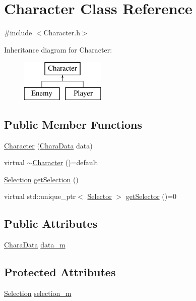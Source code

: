 \hypertarget{class_character}{}\section{Character Class Reference}
\label{class_character}


{\ttfamily \#include $<$Character.\+h$>$}

Inheritance diagram for Character\+:\begin{figure}[H]
\begin{center}
\leavevmode
\includegraphics[height=2.000000cm]{class_character}
\end{center}
\end{figure}
\subsection*{Public Member Functions}
\begin{DoxyCompactItemize}
\item 
\hyperlink{class_character_a51971ccee9f890b6cd2f354ca6363564}{Character} (\hyperlink{struct_chara_data}{Chara\+Data} data)
\item 
virtual \hyperlink{class_character_a3333a88ae593c36b229c90371e935d42}{$\sim$\+Character} ()=default
\item 
\hyperlink{struct_selection}{Selection} \hyperlink{class_character_a854b7c44f252ed1c8456112ca2bee9a1}{get\+Selection} ()
\item 
virtual std\+::unique\+\_\+ptr$<$ \hyperlink{class_selector}{Selector} $>$ \hyperlink{class_character_a6d22f59fc20e2fd75a88cdc02f328549}{get\+Selector} ()=0
\end{DoxyCompactItemize}
\subsection*{Public Attributes}
\begin{DoxyCompactItemize}
\item 
\hyperlink{struct_chara_data}{Chara\+Data} \hyperlink{class_character_abdd384831f34238538de88709016afe8}{data\+\_\+m}
\end{DoxyCompactItemize}
\subsection*{Protected Attributes}
\begin{DoxyCompactItemize}
\item 
\hyperlink{struct_selection}{Selection} \hyperlink{class_character_a55ee12bd3ec2b766fb3cbe20c3333fe6}{selection\+\_\+m}
\end{DoxyCompactItemize}


